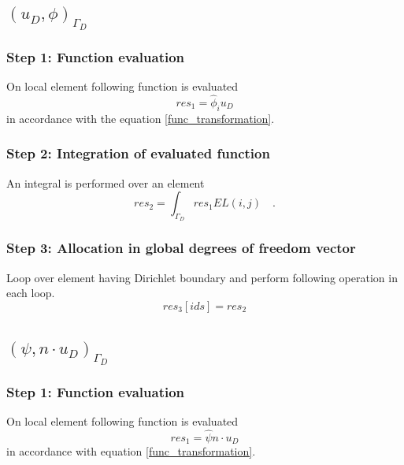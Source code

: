 \documentclass[a4paper,openany]{book}
\begin{document}
\subsection{$(u_D,\phi)_{\Gamma_D}$}

\subsubsection{Step 1: Function evaluation}

On local element following function is evaluated 
\begin{equation}
res_1=\hat{\phi}_i u_D
\end{equation} 
in accordance with the equation \eqref{func_transformation}.

\subsubsection{Step 2: Integration of evaluated function}

An integral is performed over an element 
\begin{equation}
res_2=\int_{\Gamma_D} res_1 EL(i,j) \quad \textrm{.}
\end{equation}

\subsubsection{Step 3: Allocation in global degrees of freedom vector}

Loop over element having Dirichlet boundary and perform following operation in each loop. 
\begin{equation}
res_3[ids]=res_2
\end{equation}

\subsection{$(\psi, n \cdot u_D)_{\Gamma_D} $}

\subsubsection{Step 1: Function evaluation}

On local element following function is evaluated 
\begin{equation}
res_1 = \hat{\psi} n\cdot u_D
\end{equation} 
in accordance with equation \eqref{func_transformation}.\\
\end{document}
